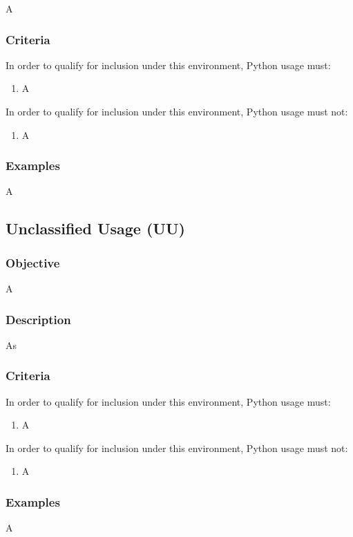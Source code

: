 			A

		\subsubsection{Criteria}

			In order to qualify for inclusion under this environment, Python usage must:

			\begin{enumerate}
        		\item A
        	\end{enumerate}

			In order to qualify for inclusion under this environment, Python usage must not:

			\begin{enumerate}
        		\item A
        	\end{enumerate}

		\subsubsection{Examples}

			A


	\subsection{Unclassified Usage (UU)}

		\subsubsection{Objective}

			A

		\subsubsection{Description}

			As

		\subsubsection{Criteria}

			In order to qualify for inclusion under this environment, Python usage must:

			\begin{enumerate}
        		\item A
        	\end{enumerate}

			In order to qualify for inclusion under this environment, Python usage must not:

			\begin{enumerate}
        		\item A
        	\end{enumerate}

		\subsubsection{Examples}

			A
